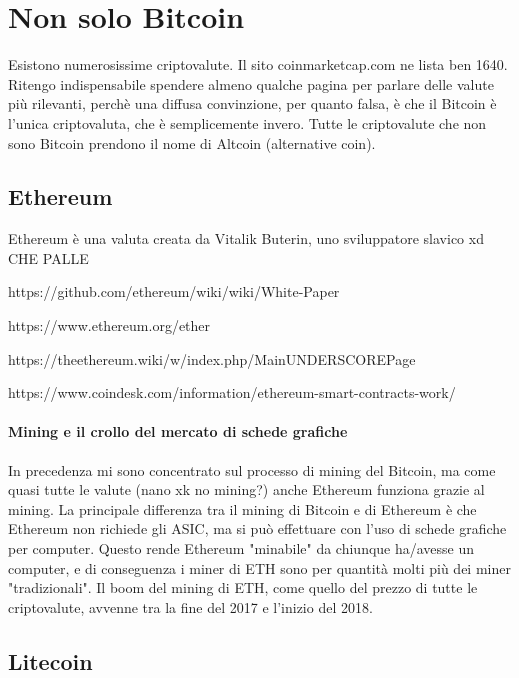 \documentclass {article}
\begin{document}
\section {Non solo Bitcoin}


Esistono numerosissime criptovalute. Il sito coinmarketcap.com ne lista ben 1640. Ritengo indispensabile spendere almeno qualche pagina per parlare delle valute più rilevanti, perchè una diffusa convinzione, per quanto falsa, è che il Bitcoin è l'unica criptovaluta, che è semplicemente invero. Tutte le criptovalute che non sono Bitcoin prendono il nome di Altcoin (alternative coin).


\subsection {Ethereum}


Ethereum è una valuta creata da Vitalik Buterin, uno sviluppatore slavico xd CHE PALLE

https://github.com/ethereum/wiki/wiki/White-Paper

https://www.ethereum.org/ether

https://theethereum.wiki/w/index.php/MainUNDERSCOREPage

https://www.coindesk.com/information/ethereum-smart-contracts-work/


\paragraph {Mining e il crollo del mercato di schede grafiche}


In precedenza mi sono concentrato sul processo di mining del Bitcoin, ma come quasi tutte le valute (nano xk no mining?) anche Ethereum funziona grazie al mining.
La principale differenza tra il mining di Bitcoin e di Ethereum è che Ethereum non richiede gli ASIC, ma si può effettuare con l'uso di schede grafiche per computer.
Questo rende Ethereum "minabile" da chiunque ha/avesse un computer, e di conseguenza i miner di ETH sono per quantità molti più dei miner "tradizionali".
Il boom del mining di ETH, come quello del prezzo di tutte le criptovalute, avvenne tra la fine del 2017 e l'inizio del 2018.


\subsection {Litecoin}
\end{document}
